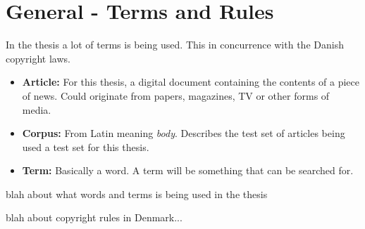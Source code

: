 \chapter{General - Terms and Rules}
In the thesis a lot of terms is being used. This in concurrence with the Danish copyright laws.
\begin{itemize}
\item \textbf{Article:} For this thesis, a digital document containing the contents of a piece of news. Could originate from papers, magazines, TV or other forms of media.
\item \textbf{Corpus:} From Latin meaning \textit{body}. Describes the test set of articles being used a test set for this thesis.
\item \textbf{Term:} Basically a word. A term will be something that can be searched for.
\end{itemize}

blah about what words and terms is being used in the thesis

blah about copyright rules in Denmark...